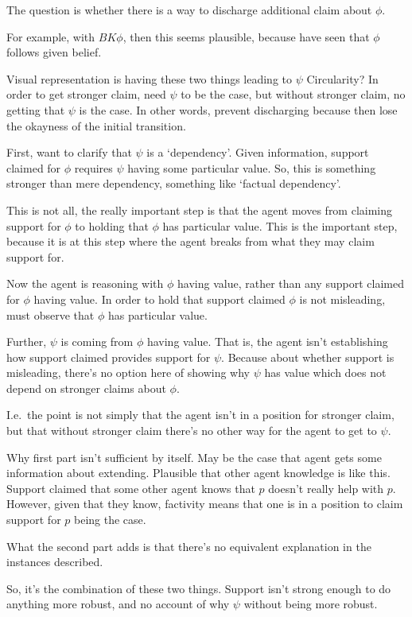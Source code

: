 \begin{note}[Explanation of \nI{}]
  The question is whether there is a way to discharge additional claim about \(\phi\).

  For example, with \(BK\phi\), then this seems plausible, because have seen that \(\phi\) follows given belief.

  {Visual representation is having these two things leading to \(\psi\)}
  Circularity?
  In order to get stronger claim, need \(\psi\) to be the case, but without stronger claim, no getting that \(\psi\) is the case.
  In other words, prevent discharging because then lose the okayness of the initial transition.


  First, want to clarify that \(\psi\) is a `dependency'.
  Given information, support claimed for \(\phi\) requires \(\psi\) having some particular value.
  So, this is something stronger than mere dependency, something like `factual dependency'.

  This is not all, the really important step is that the agent moves from claiming support for \(\phi\) to holding that \(\phi\) has particular value.
  This is the important step, because it is at this step where the agent breaks from what they may claim support for.

  Now the agent is reasoning with \(\phi\) having value, rather than any support claimed for \(\phi\) having value.
  In order to hold that support claimed \(\phi\) is not misleading, must observe that \(\phi\) has particular value.

  Further, \(\psi\) is coming from \(\phi\) having value.
  That is, the agent isn't establishing how support claimed provides support for \(\psi\).
  Because about whether support is misleading, there's no option here of showing why \(\psi\) has value which does not depend on stronger claims about \(\phi\).

  I.e.\ the point is not simply that the agent isn't in a position for stronger claim, but that without stronger claim there's no other way for the agent to get to \(\psi\).
\end{note}


\begin{note}[clarifying]
  Why first part isn't sufficient by itself.
  May be the case that agent gets some information about extending.
  Plausible that other agent knowledge is like this.
  Support claimed that some other agent knows that \(p\) doesn't really help with \(p\).
  However, given that they know, factivity means that one is in a position to claim support for \(p\) being the case.

  What the second part adds is that there's no equivalent explanation in the instances described.

  So, it's the combination of these two things.
  Support isn't strong enough to do anything more robust, and no account of why \(\psi\) without being more robust.
\end{note}

